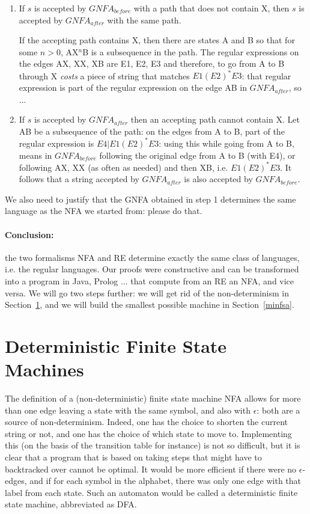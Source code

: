 \begin{enumerate}
\item
If $s$ is accepted by $GNFA_{before}$ with a path that does not
contain X, then $s$ is accepted by $GNFA_{after}$ with the same path.

If the accepting path contains X, then there are states A and B so
that for some $n>0$, AX$^n$B is a subsequence in the path. The
regular expressions on the edges AX, XX, XB are E1, E2, E3 and
therefore, to go from A to B through X {\em costs} a piece of string
that matches $E1(E2)^*E3$: that regular expression is part of the
regular expression on the edge AB in $GNFA_{after}$, so ...

\item
If $s$ is accepted by $GNFA_{after}$ then an accepting path cannot
contain X. Let AB be a subsequence of the path: on the edges from A to
B, part of the regular expression is $E4 | E1(E2)^*E3$: using this
while going from A to B, means in $GNFA_{before}$ following the
original edge from A to B (with E4), or following AX, XX (as often as
needed) and then XB, i.e. $E1(E2)^*E3$. It follows that a string
accepted by $GNFA_{after}$ is also accepted by $GNFA_{before}$.

\end{enumerate}

We also need to justify that the GNFA obtained in step 1 determines
the same language as the NFA we started from: please do that.




\paragraph{Conclusion:} the two formalisms NFA and RE determine
exactly the same class of languages, i.e. the regular languages. Our
proofs were constructive and can be transformed into a program in
Java, Prolog ... that compute from an RE an NFA, and vice versa.
We will go two steps further: we will get rid of the non-determinism
in Section~\ref{detfsa}, and we will build the smallest possible
machine in Section~\ref{minfsa}.






\section{Deterministic Finite State Machines}\label{detfsa}

The definition of a (non-deterministic) finite state machine NFA
allows for more than one edge leaving a state with the same symbol,
and also with $\epsilon$: both are a source of
non-determinism. Indeed, one has the choice to shorten the current
string or not, and one has the choice of which state to
move to. Implementing this (on the basis of the transition table for
instance) is not so difficult, but it is clear that a program that is
based on taking steps that might have to backtracked over cannot be
optimal. It would be more efficient if there were no $\epsilon$-edges,
and if for each symbol in the alphabet, there was only one edge with
that label from each state. Such an automaton would be called a
deterministic finite state machine, abbreviated as DFA.

